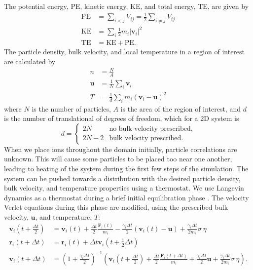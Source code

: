 \documentclass{article}
\begin{document}
The potential energy, PE, kinetic energy, KE, and total energy, TE, are given by
\begin{align*}
\text{PE} &= \sum_{i<j}V_{ij} = \frac{1}{2}\sum_{i\neq j}V_{ij} \\
\text{KE}	&= \sum_{i}\frac{1}{2}m_i|\mathbf{v}_i|^2 \\
\text{TE}		&= \text{KE} + \text{PE}.
\end{align*}
The particle density, bulk velocity, and local temperature in a region of interest are calculated by
\begin{align*}
n &= \frac{N}{A} \\
\mathbf{u} &= \frac{1}{N}\sum_{i}\mathbf{v}_i \\
T &= \frac{1}{d}\sum_{i}m_i(\mathbf{v}_i-\mathbf{u})^2
\end{align*}
where $N$ is the number of particles, $A$ is the area of the region of interest, and $d$ is the number of translational of degrees of freedom, which for a 2D system is
\begin{equation*}
d = \begin{cases}
	2N& 	\text{no bulk velocity prescribed}, \\
	2N-2&	\text{bulk velocity prescribed.}
\end{cases}
\end{equation*}
When we place ions throughout the domain initially, particle correlations are unknown. This will cause some particles to be placed too near one another, leading to heating of the system during the first few steps of the simulation. The system can be pushed towards a distribution with the desired particle density, bulk velocity, and temperature properties using a thermostat. We use Langevin dynamics as a thermostat during a brief initial equilibration phase \cite{hunenberger2005thermostat}. The velocity Verlet equations during this phase are modified, using the prescribed bulk velocity, $\mathbf{u}$, and temperature, $T$:
\begin{align*}
\mathbf{v}_i\left(t+\frac{\Delta t}{2}\right) &= \mathbf{v}_i(t) + \frac{\Delta t}{2}\frac{\mathbf{F}_i(t)}{m_i} - \frac{\gamma_i\Delta t}{2}\left(\mathbf{v}_i(t)-\mathbf{u}\right) + \frac{\gamma_i\Delta t}{2m_i}\sigma\:\eta \\
\mathbf{r}_i(t+\Delta t) &= \mathbf{r}_i(t) + \Delta t\mathbf{v}_i\left(t+\frac{1}{2}\Delta t\right) \\
\mathbf{v}_i(t+\Delta t) &= \left(1 + \frac{\gamma_i\Delta t}{2}\right)^{-1} \left(\mathbf{v}_i\left(t+\frac{\Delta t}{2}\right) +  \frac{\Delta t}{2}\frac{\mathbf{F}_i(t+\Delta t)}{m_i} + \frac{\gamma_i\Delta t}{2}\mathbf{u} + \frac{\gamma_i \Delta t}{2m_i}\sigma\:\eta\right).
\end{align*}
\end{document}
